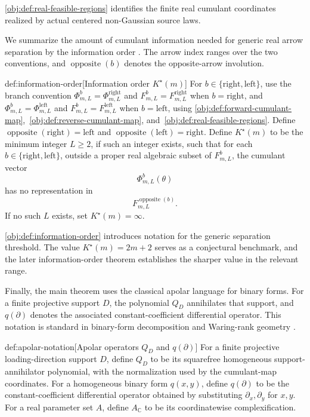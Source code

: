 \documentclass[11pt]{article}
\begin{document}
\cref{obj:def:real-feasible-regions} identifies the finite real cumulant coordinates realized by actual centered non-Gaussian source laws.

We summarize the amount of cumulant information needed for generic real arrow separation by the information order . The arrow index  ranges over the two conventions, and \(\operatorname{opposite}(b)\) denotes the opposite-arrow involution.

\begin{definitionv}{def:information-order}[Information order \(K^\star(m)\)]
For \(b\in\{\mathrm{right},\mathrm{left}\}\), use the branch convention \(\Phi^b_{m,L}=\Phi^{\mathrm{right}}_{m,L}\) and \(F^b_{m,L}=F^{\mathrm{right}}_{m,L}\) when \(b=\mathrm{right}\), and \(\Phi^b_{m,L}=\Phi^{\mathrm{left}}_{m,L}\) and \(F^b_{m,L}=F^{\mathrm{left}}_{m,L}\) when \(b=\mathrm{left}\), using \cref{obj:def:forward-cumulant-map},~\cref{obj:def:reverse-cumulant-map}, and~\cref{obj:def:real-feasible-regions}. Define \(\operatorname{opposite}(\mathrm{right})=\mathrm{left}\) and \(\operatorname{opposite}(\mathrm{left})=\mathrm{right}\). Define \(K^\star(m)\) to be the minimum integer \(L\geq 2\), if such an integer exists, such that for each \(b\in\{\mathrm{right},\mathrm{left}\}\), outside a proper real algebraic subset of \(F^b_{m,L}\), the cumulant vector
\[
\Phi^b_{m,L}(\theta)
\]
has no representation in
\[
F^{\operatorname{opposite}(b)}_{m,L}.
\]
If no such \(L\) exists, set \(K^\star(m)=\infty\).
\end{definitionv}

\cref{obj:def:information-order} introduces notation for the generic separation threshold. The value \(K^\star(m)=2m+2\) serves as a conjectural benchmark, and the later information-order theorem establishes the sharper value in the relevant range.

Finally, the main theorem uses the classical apolar language for binary forms. For a finite projective support \(D\), the polynomial \(Q_D\) annihilates that support, and \(q(\partial)\) denotes the associated constant-coefficient differential operator. This notation is standard in binary-form decomposition and Waring-rank geometry \citep{ComonMourrain1996,Landsberg2012}.

\begin{definitionv}{def:apolar-notation}[Apolar operators \(Q_D\) and \(q(\partial)\)]
For a finite projective loading-direction support \(D\), define \(Q_D\) to be its squarefree homogeneous support-annihilator polynomial, with the normalization used by the cumulant-map coordinates. For a homogeneous binary form \(q(x,y)\), define \(q(\partial)\) to be the constant-coefficient differential operator obtained by substituting \(\partial_x,\partial_y\) for \(x,y\). For a real parameter set \(A\), define \(A_{\mathbb C}\) to be its coordinatewise complexification.
\end{definitionv}
\end{document}

